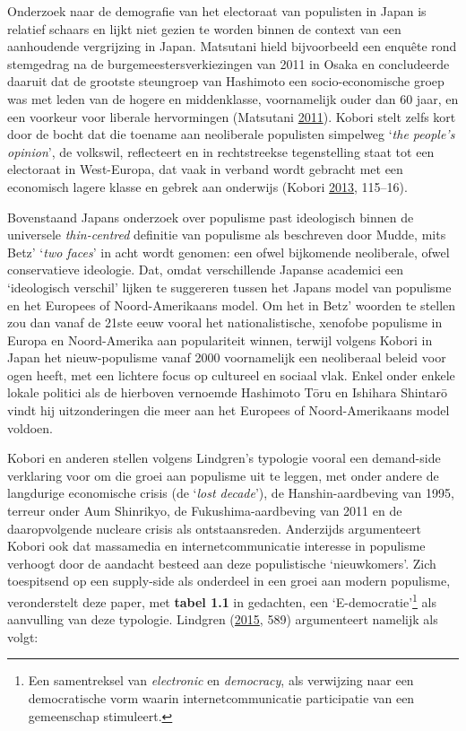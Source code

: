 \documentclass[10.5pt,dutch,]{article}
\begin{document}
Onderzoek naar de demografie van het electoraat van populisten in Japan
is relatief schaars en lijkt niet gezien te worden binnen de context van
een aanhoudende vergrijzing in Japan. Matsutani hield bijvoorbeeld een
enquête rond stemgedrag na de burgemeestersverkiezingen van 2011 in
Osaka en concludeerde daaruit dat de grootste steungroep van Hashimoto
een socio-economische groep was met leden van de hogere en middenklasse,
voornamelijk ouder dan 60 jaar, en een voorkeur voor liberale
hervormingen (Matsutani
\protect\hyperlink{ref-matsutaniux5fpopyurizumuux5f2011}{2011}). Kobori
stelt zelfs kort door de bocht dat die toename aan neoliberale
populisten simpelweg `\emph{the people's opinion}', de volkswil, reflecteert en in
rechtstreekse tegenstelling staat tot een electoraat in West-Europa, dat
vaak in verband wordt gebracht met een economisch lagere klasse en
gebrek aan onderwijs (Kobori
\protect\hyperlink{ref-koboriux5fpopulismux5f2013}{2013}, 115--16).

Bovenstaand Japans onderzoek over populisme past ideologisch binnen de
universele \emph{thin-centred} definitie van populisme als beschreven
door Mudde, mits Betz' `\emph{two faces}' in acht wordt genomen: een
ofwel bijkomende neoliberale, ofwel conservatieve ideologie. Dat, omdat
verschillende Japanse academici een `ideologisch verschil' lijken te
suggereren tussen het Japans model van populisme en het Europees of
Noord-Amerikaans model. Om het in Betz' woorden te stellen zou dan vanaf
de 21ste eeuw vooral het nationalistische, xenofobe populisme in Europa
en Noord-Amerika aan populariteit winnen, terwijl volgens Kobori in
Japan het nieuw-populisme vanaf 2000 voornamelijk een neoliberaal beleid
voor ogen heeft, met een lichtere focus op cultureel en sociaal vlak.
Enkel onder enkele lokale politici als de hierboven vernoemde Hashimoto
Tōru en Ishihara Shintarō vindt hij uitzonderingen die meer aan het
Europees of Noord-Amerikaans model voldoen.

Kobori en anderen stellen volgens Lindgren's typologie vooral een
demand-side verklaring voor om die groei aan populisme uit te leggen,
met onder andere de langdurige economische crisis (de `\emph{lost
decade}'), de Hanshin-aardbeving van 1995, terreur onder Aum Shinrikyo,
de Fukushima-aardbeving van 2011 en de daaropvolgende nucleare crisis
als ontstaansreden. Anderzijds argumenteert Kobori ook dat massamedia en
internetcommunicatie interesse in populisme verhoogt door de aandacht
besteed aan deze populistische `nieuwkomers'. Zich toespitsend op een
supply-side als onderdeel in een groei aan modern populisme,
veronderstelt deze paper, met \textbf{tabel 1.1} in gedachten, een
`E-democratie'\footnote{Een samentreksel van \emph{electronic} en
  \emph{democracy}, als verwijzing naar een democratische vorm waarin
  internetcommunicatie participatie van een gemeenschap stimuleert.} als
aanvulling van deze typologie. Lindgren
(\protect\hyperlink{ref-lindgrenux5fdevelopingux5f2015}{2015}, 589)
argumenteert namelijk als volgt:
\end{document}
